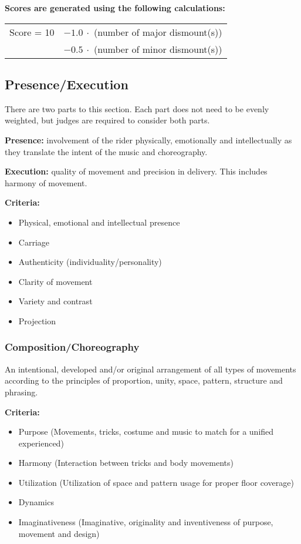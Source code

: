 \textbf{Scores are generated using the following calculations:}

\begin{tabular}{r l}
Score = 10 & $- 1.0\ \cdot$ (number of major dismount(s)) \\
 & $- 0.5\ \cdot$ (number of minor dismount(s)) \\
\end{tabular}

\subsection{Presence/Execution \label{subsec:freestyle_individual-performance-score_presence-execution}}
There are two parts to this section.
Each part does not need to be evenly weighted, but judges are required to consider both parts.

\textbf{Presence:} involvement of the rider physically, emotionally and intellectually as they translate the intent of the music and choreography.

\textbf{Execution:} quality of movement and precision in delivery.
This includes harmony of movement.

\textbf{Criteria:}
\begin{itemize}
\item Physical, emotional and intellectual presence
\item Carriage
\item Authenticity (individuality/personality)
\item Clarity of movement
\item Variety and contrast
\item Projection
\end{itemize}

\subsubsection{Composition/Choreography}
An intentional, developed and/or original arrangement of all types of movements according to the principles of proportion, unity, space, pattern, structure and phrasing.

\textbf{Criteria:}
\begin{itemize}
\item Purpose (Movements, tricks, costume and music to match for a unified experienced)
\item Harmony (Interaction between tricks and body movements)
\item Utilization (Utilization of space and pattern usage for proper floor coverage)
\item Dynamics
\item Imaginativeness (Imaginative, originality and inventiveness of purpose, movement and design)
\end{itemize}

